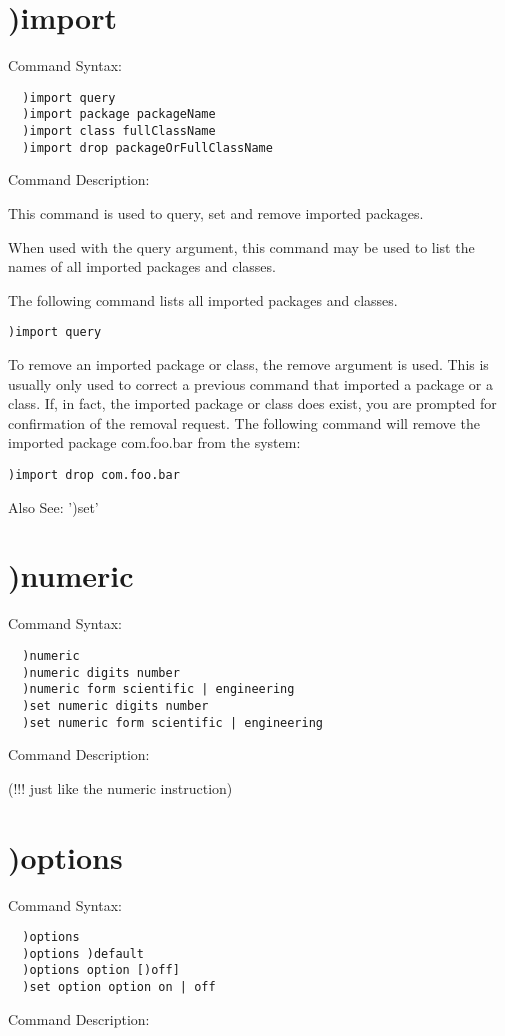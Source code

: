 \section{)import}

Command Syntax:
\begin{verbatim}
  )import query
  )import package packageName
  )import class fullClassName
  )import drop packageOrFullClassName
\end{verbatim}
Command Description:

This command is used to query, set and remove imported packages.

When used with the query argument, this command may be used to list the names of all imported packages and classes.

The following command lists all imported packages and classes.
\begin{verbatim}
)import query
\end{verbatim}
To remove an imported package or class, the remove argument is used. This is usually only used to correct a previous command that imported a package or a class. If, in fact, the imported package or class does exist, you are prompted for confirmation of the removal request. The following command will remove the imported package com.foo.bar from the system:
\begin{verbatim}
)import drop com.foo.bar
\end{verbatim}
Also See: ')set'

\section{)numeric}

Command Syntax:
\begin{verbatim}
  )numeric
  )numeric digits number
  )numeric form scientific | engineering
  )set numeric digits number
  )set numeric form scientific | engineering
\end{verbatim}
Command Description:

(!!! just like the numeric instruction)

\section{)options}

Command Syntax:
\begin{verbatim}
  )options
  )options )default
  )options option [)off]
  )set option option on | off
\end{verbatim}
Command Description:


